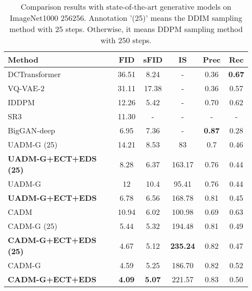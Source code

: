 \documentclass[runningheads]{llncs}
\begin{document}
\begin{table}[t]
    \setlength\tabcolsep{2.5mm}
    \caption{Comparison results with state-of-the-art generative models on ImageNet1000 256256. Annotation '(25)' means the DDIM \cite{ddim} sampling method with 25 steps. Otherwise, it means DDPM sampling method with 250 steps.
    }\label{tab:sota}
    \begin{center}








\begin{tabular}[t]{lccccc}
    
    \toprule
    Method            & FID          & sFID   & IS      & Prec      & Rec  \\


\toprule
    DCTransformer \cite{dctransformer} & 36.51 & 8.24 & - & 0.36 & \bf{0.67}  \\
    VQ-VAE-2 \cite{vqvae2}    & 31.11 & 17.38 & - & 0.36 & 0.57 \\
    IDDPM \cite{nichol2021improved}   & 12.26 & 5.42 & - & 0.70 & 0.62 \\
    SR3  \cite{sr3}  & 11.30 & - & - & - & -\\
    BigGAN-deep \cite{biggan}  & 6.95 & 7.36 & - & \bf{0.87} & 0.28\\
    \toprule
    UADM-G  \cite{dhariwal2021diffusion}(25)  & 14.21 & 8.53 & 83 & 0.7 & 0.46 \\
    \bf{UADM-G+ECT+EDS} (25) & 8.28 & 6.37 & 163.17 & 0.76 & 0.44 \\
    UADM-G  \cite{dhariwal2021diffusion}   & 12 & 10.4 & 95.41 & 0.76 & 0.44 \\
    \bf{UADM-G+ECT+EDS} & 6.78 & 6.56 & 168.78 & 0.81 & 0.45 \\
    \toprule
    CADM   \cite{dhariwal2021diffusion}     & 10.94 & 6.02 & 100.98 & 0.69 & 0.63 \\
    CADM-G (25)  \cite{dhariwal2021diffusion}  & 5.44 & 5.32 & 194.48 & 0.81 & 0.49 \\
    \bf{CADM-G+ECT+EDS} (25) & 4.67 & 5.12 & \textbf{235.24} & 0.82 & 0.47     \\
    CADM-G \cite{dhariwal2021diffusion} & 4.59 & 5.25 & 186.70 & 0.82 & 0.52 \\
    \bf{CADM-G+ECT+EDS} & \bf{4.09} & \bf{5.07} & 221.57 & 0.83 & 0.50 \\
    \toprule
    \end{tabular}


\end{center}
    \vspace{-2pt}
\end{table}
\end{document}
